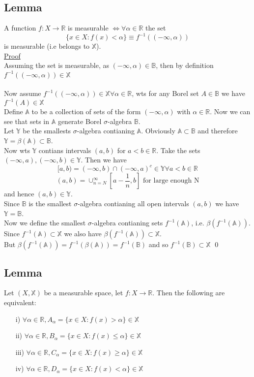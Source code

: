 \documentclass[a4paper, 12pt, twoside]{article}
\begin{document}
\subsection{Lemma}
A function $f:X \to  \mathbb{R}$ is measurable $ \iff \forall \alpha \in \mathbb{R}$ the set
$$ \{x\in X:f(x)<\alpha\} \equiv f^{-1}((-\infty,\alpha))$$
is measurable (i.e belongs to $\mathbb{X}$).\\
\noindent
\underline{Proof}\\
Assuming the set is measurable, as $(-\infty,\alpha)\in \mathbb{B}$, then by definition $f^{-1}((-\infty,\alpha))\in \mathbb{X}$\\\\
Now assume $f^{-1}((-\infty,\alpha))\in \mathbb{X} \forall \alpha\in \mathbb{R}$, wts  for any Borel set $A\in \mathbb{B}$ we have $f^{-1}(A)\in \mathbb{X}$\\
Define $\mathbb{A}$ to be a collection of sets of the form $(-\infty,\alpha) $ with $\alpha \in \mathbb{R}$. Now we can see that sets in $\mathbb{A}$ generate Borel $\sigma$-algebra $\mathbb{B}$.\\
Let $\mathbb{Y}$ be the smallests $\sigma$-algebra contianing $\mathbb{A}$. Obviously $\mathbb{A}\subset \mathbb{B}$ and therefore $\mathbb{Y}=\beta(\mathbb{A})\subset \mathbb{B}$.\\
Now wts $\mathbb{Y}$ contians intervals $(a,b)$ for $a<b\in \mathbb{R}$. Take the sets $(-\infty,a),(-\infty,b) \in \mathbb{Y}$. Then we have
$$ [a,b)=(-\infty,b)\cap (-\infty,a)^{c}\in \mathbb{Y} \forall a<b\in \mathbb{R}$$
$$(a,b)=\cup_{n=N}^{\infty}[a- \frac{1}{n},b] \text{ for large enough N}$$
and hence $(a,b)\in \mathbb{Y}$.\\
Since $\mathbb{B}$ is the smallest $\sigma$-algebra contianing all open intervals $(a,b)$ we have $\mathbb{Y}=\mathbb{B}$.\\
Now we define the smallest $\sigma$-algebra contianing sets $f^{-1}(\mathbb{A})$, i.e. $\beta(f^{-1}(\mathbb{A}))$. Since $f^{-1}(\mathbb{A})\subset \mathbb{X}$ we also have $\beta (f^{-1} (\mathbb{A})) \subset \mathbb{X}$.\\
But $\beta(f^{-1}(\mathbb{A})) = f^{-1}(\beta(\mathbb{A} )) = f^{-1}(\mathbb{B}) $ and so $ f^{-1}(\mathbb{B}) \subset \mathbb{X}$ \qed
\subsection{Lemma}
Let $(X,\mathbb{X})$ be a measurable space, let $f:X \to  \mathbb{R}$. Then the following are equivalent:
\begin{itemize}
    \item[i)] $\forall\alpha\in \mathbb{R}, A_{\alpha}=\{x\in X:f(x)>\alpha\}\in \mathbb{X}$
    \item[ii)] $\forall\alpha\in \mathbb{R}, B_{\alpha}=\{x\in X:f(x)\leq\alpha\}\in \mathbb{X}$
    \item[iii)] $\forall\alpha\in \mathbb{R}, C_{\alpha}=\{x\in X:f(x)\geq\alpha\}\in \mathbb{X}$
    \item[iv)] $\forall\alpha\in \mathbb{R}, D_{\alpha}=\{x\in X:f(x)<\alpha\}\in \mathbb{X}$
\end{itemize}
\end{document}
